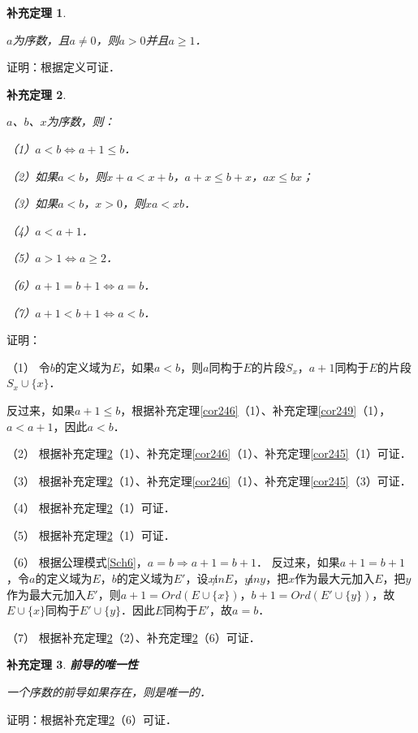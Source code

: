 \documentclass[12pt, a4paper, oneside]{book}
\newtheorem{cor}{补充定理}
\begin{document}
			\begin{cor}\label{cor256}
				\hfill\par
				$a$为序数，且$a\neq 0$，则$a>0$并且$a\geq 1$．
			\end{cor}
			证明：根据定义可证．
						
			\begin{cor}\label{cor257}
				\hfill\par
				$a$、$b$、$x$为序数，则：
				\par
				（1）$a<b\Leftrightarrow a+1\leq b$．
				\par
				（2）如果$a<b$，则$x+a<x+b$，$a+x\leq b+x$，$ax\leq bx$；
				\par
				（3）如果$a<b$，$x>0$，则$xa<xb$．
				\par
				（4）$a<a+1$．
				\par
				（5）$a>1\Leftrightarrow a\geq 2$．
				\par
				（6）$a+1=b+1\Leftrightarrow a=b$．
				\par
				（7）$a+1<b+1\Leftrightarrow a<b$．
			\end{cor}
			证明：
			\par
			（1）	令$b$的定义域为$E$，如果$a<b$，则$a$同构于$E$的片段$S_x$，$a+1$同构于$E$的片段$S_x\cup\{x\}$．
			\par
			反过来，如果$a+1\leq b$，根据补充定理\ref{cor246}（1）、补充定理\ref{cor249}（1），$a<a+1$，因此$a<b$．
			\par
			（2）	根据补充定理\ref{cor257}（1）、补充定理\ref{cor246}（1）、补充定理\ref{cor245}（1）可证．
			\par
			（3）	根据补充定理\ref{cor257}（1）、补充定理\ref{cor246}（1）、补充定理\ref{cor245}（3）可证．
			\par
			（4）	根据补充定理\ref{cor257}（1）可证．
			\par
			（5）	根据补充定理\ref{cor257}（1）可证．
			\par
			（6）	根据公理模式\ref{Sch6}，$a=b\Rightarrow a+1=b+1$．
			反过来，如果$a+1=b+1$，令$a$的定义域为$E$，$b$的定义域为$E'$，设$x \not in E$，$y \not in y$，把$x$作为最大元加入$E$，把$y$作为最大元加入$E'$，则$a+1=Ord(E\cup\{x\})$，$b+1=Ord(E'\cup\{y\})$，故$E\cup\{x\}$同构于$E'\cup \{y\}$．因此$E$同构于$E'$，故$a=b$．
			\par
			（7）	根据补充定理\ref{cor257}（2）、补充定理\ref{cor257}（6）可证．
			
			\begin{cor}\label{cor258}
				\textbf{前导的唯一性}
				\par
				一个序数的前导如果存在，则是唯一的．
			\end{cor}
			证明：根据补充定理\ref{cor257}（6）可证．
			
\end{document}
